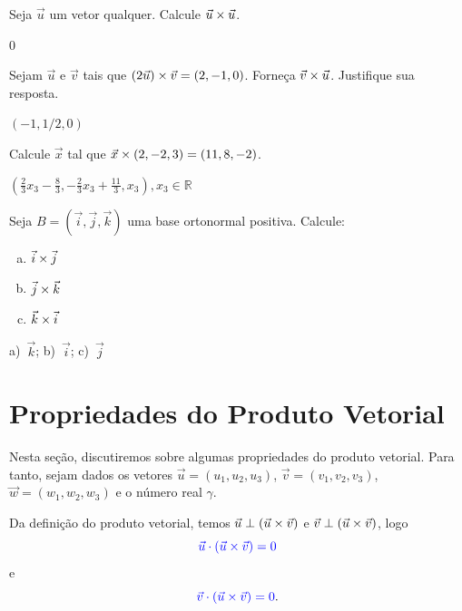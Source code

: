 \begin{exer}
  Seja $\vec{u}$ um vetor qualquer. Calcule $\vec{u}\times\vec{u}$.
\end{exer}
\begin{resp}
  $0$
\end{resp}

\begin{exer}
  Sejam $\vec{u}$ e $\vec{v}$ tais que $(2\vec{u})\times\vec{v}=(2,-1,0)$. Forneça $\vec{v}\times\vec{u}$. Justifique sua resposta.
\end{exer}
\begin{resp}
  $(-1,1/2,0)$
\end{resp}

\begin{exer}
  Calcule $\vec{x}$ tal que $\vec{x}\times (2,-2,3)=(11,8,-2)$.
\end{exer}
\begin{resp}
  $\left(\frac{2}{3}x_3-\frac{8}{3},-\frac{2}{3}x_3+\frac{11}{3},x_3\right), x_3\in\mathbb{R}$
\end{resp}

\begin{exer}
  Seja $B=(\vec{i},\vec{j},\vec{k})$ uma base ortonormal positiva. Calcule:
  \begin{enumerate}[a)]
  \item $\vec{i}\times\vec{j}$
  \item $\vec{j}\times\vec{k}$
  \item $\vec{k}\times\vec{i}$
  \end{enumerate}
\end{exer}
\begin{resp}
  a)~$\vec{k}$; b)~$\vec{i}$; c)~$\vec{j}$
\end{resp}

\section{Propriedades do Produto Vetorial}\label{cap_prodvet_sec_prop}
\badgeRevisar

Nesta seção, discutiremos sobre algumas propriedades do produto vetorial. Para tanto, sejam dados os vetores $\vec{u} = (u_1,u_2,u_3)$, $\vec{v}=(v_1,v_2,v_3)$, $\vec{w}=(w_1,w_2,w_3)$ e o número real $\gamma$.

Da definição do produto vetorial, temos $\vec{u}\perp(\vec{u}\times\vec{v})$ e $\vec{v}\perp(\vec{u}\times\vec{v})$, logo
\begin{equation}
  {\color{blue}\vec{u}\cdot(\vec{u}\times\vec{v}) = 0}
\end{equation}
e
\begin{equation}
  {\color{blue}\vec{v}\cdot(\vec{u}\times\vec{v}) = 0}.
\end{equation}

